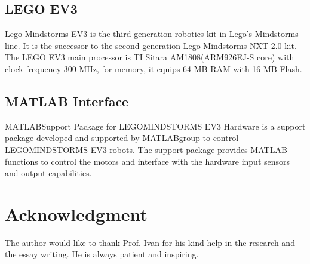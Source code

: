 \documentclass[journal]{IEEEtran}
\begin{document}
\subsection{LEGO EV3}
Lego Mindstorms EV3 is the third generation robotics kit in Lego's Mindstorms line. It is the successor to the second generation Lego Mindstorms NXT 2.0 kit. The LEGO EV3 main processor is TI Sitara AM1808(ARM926EJ-S core) with clock frequency 300 MHz, for memory, it equips 64 MB RAM with 16 MB Flash.\cite{lego-intro}
\subsection{MATLAB Interface}
MATLAB\textregistered  Support Package for LEGO\textregistered MINDSTORMS EV3 Hardware is a support package developed and supported by MATLAB\textregistered group to control LEGO\textregistered MINDSTORMS EV3 robots. The support package provides MATLAB functions to control the motors and interface with the hardware input sensors and output capabilities. 
%


\section*{Acknowledgment}


The author would like to thank Prof. Ivan for his kind help in the research and the essay writing. He is always patient and inspiring.


\ifCLASSOPTIONcaptionsoff
  \newpage
\fi






 
\end{document}

